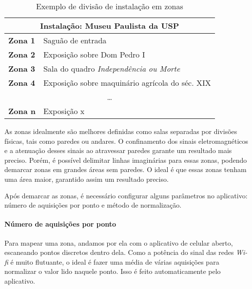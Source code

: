 \begin{table}[htb]
\centering
\caption{Exemplo de divisão de instalação em zonas}
\label{my-label}
\begin{tabular}{|l|l|l|l|l|}
\hline
\multicolumn{5}{|c|}{\textbf{Instalação: Museu Paulista da USP}}             \\ \hline
\multicolumn{2}{|l|}{\textbf{Zona 1}} & \multicolumn{3}{l|}{Saguão de entrada}          \\ \hline
\multicolumn{2}{|l|}{\textbf{Zona 2}} & \multicolumn{3}{l|}{Exposição sobre Dom Pedro I}          \\ \hline
\multicolumn{2}{|l|}{\textbf{Zona 3}} & \multicolumn{3}{l|}{Sala do quadro \textit{Independência ou Morte}}          \\ \hline
\multicolumn{2}{|l|}{\textbf{Zona 4}} & \multicolumn{3}{l|}{Exposição sobre maquinário agrícola do séc. XIX}          \\ \hline
\multicolumn{5}{|c|}{\ldots}                                                    \\ \hline
\multicolumn{2}{|l|}{\textbf{Zona n}} & \multicolumn{3}{l|}{Exposição x}     \\ \hline
\end{tabular}
\end{table}

As zonas idealmente são melhores definidas como salas separadas por divisões físicas, tais como paredes ou andares. O confinamento dos sinais eletromagnéticos e a atenuação desses sinais ao atravessar paredes garante um resultado mais preciso. Porém, é possível delimitar linhas imaginárias para essas zonas, podendo demarcar zonas em grandes áreas sem paredes. O ideal é que essas zonas tenham uma área maior, garantido assim um resultado preciso.
\par
Após demarcar as zonas, é necessário configurar alguns parâmetros no aplicativo: número de aquisições por ponto e método de normalização.

\paragraph{Número de aquisições por ponto\\}
Para mapear uma zona, andamos por ela com o aplicativo de celular aberto, escaneando pontos discretos dentro dela. Como a potência do sinal das redes \textit{Wi-fi} é muito flutuante, o ideal é fazer uma média de várias aquisições para normalizar o valor lido naquele ponto. Isso é feito automaticamente pelo aplicativo.

